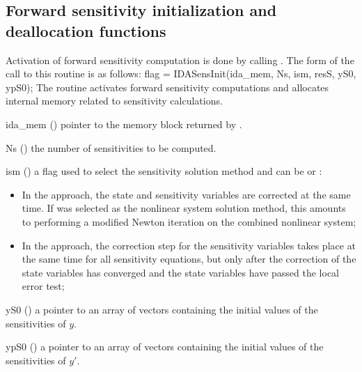 \subsection{Forward sensitivity initialization and deallocation functions}
\label{ss:sensi_init}
Activation of forward sensitivity computation is done by calling
.
The form of the call to this routine is as follows:
{
  flag = IDASensInit(ida\_mem, Ns, ism, resS, yS0, ypS0);
}
{
  The routine  activates forward sensitivity computations and
  allocates internal memory related to sensitivity calculations.
}
{
  \begin{args}

  \item[ida\_mem] ()
    pointer to the {\idas} memory block returned by .
  \item[Ns] () 
    the number of sensitivities to be computed.
  \item[ism] ()
    a flag used to select the sensitivity solution method and can 
    be  or :
    \begin{itemize}
    \item In the  approach, the state and sensitivity variables are
      corrected at the same time. If  was selected as the nonlinear system 
      solution method, this amounts to performing a modified Newton iteration on the
      combined nonlinear system;
    \item In the  approach, the correction step for the sensitivity
      variables takes place at the same time for all sensitivity equations, but only after 
      the correction of the state variables has converged and the state variables 
      have passed the local error test; 
    \end{itemize}
  \item[yS0] () 
    a pointer to an array of  vectors containing the initial 
    values of the sensitivities of $y$.
  \item[ypS0] () 
    a pointer to an array of  vectors containing the initial 
    values of the sensitivities of $y'$.
  \end{args}
}
